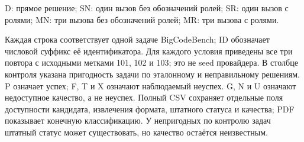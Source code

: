D: прямое решение; SN: один вызов без обозначений ролей; SR: один вызов с ролями; MN: три вызова без обозначений ролей; MR: три вызова с ролями.

Каждая строка соответствует одной задаче BigCodeBench; ID обозначает числовой суффикс её идентификатора. Для каждого условия приведены все три повтора с исходными метками 101, 102 и 103; это не seed провайдера. В столбце контроля указана пригодность задачи по эталонному и неправильному решениям. P означает успех; F, T и X означают наблюдаемый неуспех. G, N и U означают недоступное качество, а не неуспех. Полный CSV сохраняет отдельные поля доступности кандидата, извлечения формата, штатного статуса и качества; PDF показывает конечную классификацию. У непригодных по контролю задач штатный статус может существовать, но качество остаётся неизвестным.


